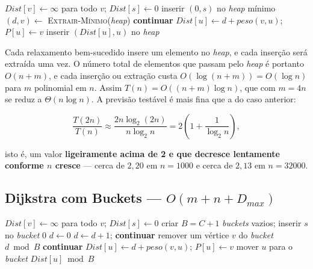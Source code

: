\documentclass[12pt,a4paper]{article}
\begin{document}
\begin{algorithm}[H]
\caption{\textsc{Dijkstra-Heap}$(G, s)$}
\begin{algorithmic}[1]
\State $Dist[v] \gets \infty$ para todo $v$; \quad $Dist[s] \gets 0$
\State inserir $(0, s)$ no \emph{heap} mínimo
  \State $(d, v) \gets$ \textsc{Extrair-Mínimo}(\emph{heap}) 
   \State \textbf{continuar}  \EndIf
      \State $Dist[u] \gets d + peso(v,u)$; \quad $P[u] \gets v$
      \State inserir $(Dist[u], u)$ no \emph{heap} 
    \EndIf
  \EndFor
\EndWhile
\end{algorithmic}
\end{algorithm}

Cada relaxamento bem-sucedido insere um elemento no \emph{heap}, e cada
inserção será extraída uma vez. O número total de elementos que passam pelo
\emph{heap} é portanto $O(n + m)$, e cada inserção ou extração custa
$O(\log(n+m)) = O(\log n)$ para $m$ polinomial em $n$. Assim
$T(n) = O((n+m)\log n)$, que com $m = 4n$ se reduz a $\Theta(n \log n)$.
A previsão testável é mais fina que a do caso anterior:

\[
\frac{T(2n)}{T(n)} \approx \frac{2n \log_2 (2n)}{n \log_2 n}
= 2\left(1 + \frac{1}{\log_2 n}\right),
\]

isto é, um valor \textbf{ligeiramente acima de 2 e que decresce lentamente
conforme $n$ cresce} --- cerca de $2{,}20$ em $n = 1000$ e cerca de $2{,}13$
em $n = 32000$.

\subsection{Dijkstra com Buckets --- \texorpdfstring{$O(m + n + D_{max})$}{O(m + n + Dmax)}}

\begin{algorithm}[H]
\caption{\textsc{Dijkstra-Bucket}$(G, s, C)$ --- \emph{buckets} circulares}
\begin{algorithmic}[1]
\State $Dist[v] \gets \infty$ para todo $v$; \quad $Dist[s] \gets 0$
\State criar $B = C+1$ \emph{buckets} vazios; inserir $s$ no \emph{bucket} $0$
\State $d \gets 0$
   \State $d \gets d+1$; \textbf{continuar} \EndIf
  \State remover um vértice $v$ do \emph{bucket} $d \bmod B$ 
   \State \textbf{continuar} \EndIf
      \State $Dist[u] \gets d + peso(v,u)$; \quad $P[u] \gets v$
      \State mover $u$ para o \emph{bucket} $Dist[u] \bmod B$ 
    \EndIf
  \EndFor
\EndWhile
\end{algorithmic}
\end{algorithm}
\end{document}
